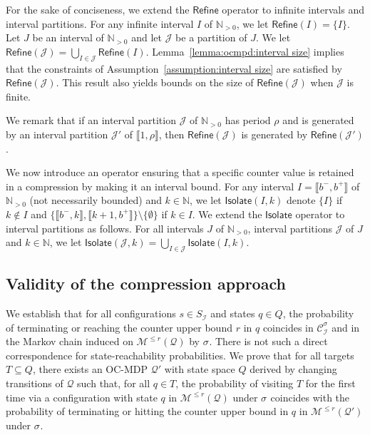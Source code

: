 \documentclass[a4paper,UKenglish,cleveref,autoref,thm-restate,colorlinks]{lipics-v2021}
\newcommand{\integerInterval}[1]{\llbracket{}#1\rrbracket{}}
\newcommand{\IN}{\mathbb{N}}
\newcommand{\INpos}{\IN_{>0}}
\newcommand{\mdp}{\mathcal{M}}
\newcommand{\mdpStateSpace}{S}
\newcommand{\ocmdp}{\mathcal{Q}}
\newcommand{\ocmdpFin}[2]{\mdp^{\leq #2}(#1)}
\newcommand{\ocStateSpace}{Q}
\newcommand{\ocState}{q}
\newcommand{\ocCount}{k}
\newcommand{\ocConfig}{s}
\newcommand{\counterUB}{r}
\newcommand{\period}{\rho}
\newcommand{\mchain}{\mathcal{C}}
\newcommand{\intPart}{\mathcal{I}}
\newcommand{\intPartB}{\mathcal{J}}
\newcommand{\interval}{I}
\newcommand{\intervalB}{J}
\newcommand{\intBound}{b}
\newcommand{\intLB}{\intBound^-}
\newcommand{\intUB}{\intBound^+}
\newcommand{\compressChainStrat}[1]{\mchain^{#1}_{\intPart}}
\newcommand{\compressChain}{\compressChainStrat{\strat}}
\newcommand{\compressChainStateSpace}{\mdpStateSpace_{\intPart}}
\newcommand{\target}{T}
\newcommand{\stratGeneric}[1]{{\sigma_{#1}}}
\newcommand{\strat}{\stratGeneric{}}
\begin{document}
For the sake of conciseness, we extend the $\mathsf{Refine}$ operator to infinite intervals and interval partitions.
For any infinite interval $\interval$ of $\INpos$, we let $\mathsf{Refine}(\interval) = \{\interval\}$.
Let $\intervalB$ be an interval of $\INpos$ and let $\intPartB$ be a partition of $\intervalB$.
We let $\mathsf{Refine}(\intPartB) = \bigcup_{\interval\in\intPartB}\mathsf{Refine}(\interval)$.
Lemma~\ref{lemma:ocmpd:interval size} implies that the constraints of Assumption~\ref{assumption:interval size} are satisfied by $\mathsf{Refine}(\intPartB)$. 
This result also yields bounds on the size of $\mathsf{Refine}(\intPartB)$ when $\intPartB$ is finite.

We remark that if an interval partition $\intPartB$ of $\INpos$ has period $\period$ and is generated by an interval partition $\intPartB'$ of $\integerInterval{1, \period}$, then $\mathsf{Refine}(\intPartB)$ is generated by $\mathsf{Refine}(\intPartB')$.

We now introduce an operator ensuring that a specific counter value is retained in a compression by making it an interval bound.
For any interval $\interval=\integerInterval{\intLB, \intUB}$ of $\INpos$ (not necessarily bounded) and $\ocCount\in\IN$, we let $\mathsf{Isolate}(\interval, \ocCount)$ denote $\{\interval\}$ if $\ocCount\notin\interval$ and $\{\integerInterval{\intLB, \ocCount}, \integerInterval{\ocCount+1, \intUB}\}\setminus\{\emptyset\}$ if $\ocCount\in\interval$.
We extend the $\mathsf{Isolate}$ operator to interval partitions as follows.
For all intervals $\intervalB$ of $\INpos$, interval partitions $\intPartB$ of $\intervalB$ and $\ocCount\in\IN$, we let $\mathsf{Isolate}(\intPartB, \ocCount) = \bigcup_{\interval\in\intPartB}\mathsf{Isolate}(\interval, \ocCount)$.


\subsection{Validity of the compression approach}\label{section:abstraction:validation}

We establish that for all configurations $\ocConfig\in\compressChainStateSpace$ and states $\ocState\in\ocStateSpace$, the probability of terminating or reaching the counter upper bound $\counterUB$ in $\ocState$ coincides in $\compressChain$ and in the Markov chain induced on $\ocmdpFin{\ocmdp}{\counterUB}$ by $\strat$.
There is not such a direct correspondence for state-reachability probabilities.
We prove that for all targets $\target\subseteq\ocStateSpace$, there exists an OC-MDP $\ocmdp'$ with state space $\ocStateSpace$ derived by changing transitions of $\ocmdp$ such that, for all $\ocState\in\target$, the probability of visiting $\target$ for the first time via a configuration with state $\ocState$ in $\ocmdpFin{\ocmdp}{\counterUB}$ under $\strat$ coincides with the probability of terminating or hitting the counter upper bound in $\ocState$ in $\ocmdpFin{\ocmdp'}{\counterUB}$ under $\strat$.
\end{document}
